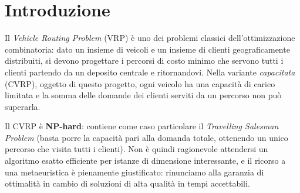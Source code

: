 \documentclass[10pt,a4paper]{article}
\begin{document}
\begin{abstract}
\large
\noindent
Questo lavoro presenta un algoritmo immunologico ispirato al principio della
selezione clonale (opzione~2 della consegna), ibridato con una ricerca locale a
vicinati multipli, per il \emph{Capacitated Vehicle Routing Problem}. L'elemento
portante è la rappresentazione di ogni soluzione come singola permutazione di
clienti (\emph{giant tour}), con la suddivisione in percorsi delegata a un
decodificatore \emph{esatto} basato su programmazione dinamica (\emph{Split}).
Sulle dieci istanze CVRPLIB richieste, con $5$~esecuzioni indipendenti ciascuna e
criterio di arresto $\mathrm{FE}=3.5\times 10^5$, l'algoritmo raggiunge uno scarto
medio dall'ottimo noto dell'$1{,}82\%$ (minimo $0{,}17\%$, massimo $5{,}58\%$);
tutte le città sono servite in tutte le esecuzioni e il vincolo sul numero di
veicoli è sempre rispettato. Un'analisi conclusiva scompone in modo esatto lo
scarto residuo, mostrando che esso è interamente imputabile all'\emph{assegnamento}
dei clienti ai veicoli e non all'\emph{ordinamento} interno dei percorsi, che
risulta ottimo in tutte le soluzioni prodotte.
\end{abstract}
\newpage
{}
\tableofcontents
\bigskip
\newpage
\section{Introduzione}
\label{sec:intro}

Il \emph{Vehicle Routing Problem} (VRP) è uno dei problemi
classici dell'ottimizzazione combinatoria: dato un insieme di veicoli e un
insieme di clienti geograficamente distribuiti, si devono progettare i percorsi
di costo minimo che servono tutti i clienti partendo da un deposito centrale e
ritornandovi. Nella variante \emph{capacitata} (CVRP), oggetto
di questo progetto, ogni veicolo ha una capacità di carico limitata e la somma
delle domande dei clienti serviti da un percorso non può superarla.

Il CVRP è \textbf{NP-hard}: contiene come caso particolare il \emph{Travelling
Salesman Problem} (basta porre la capacità pari alla domanda totale, ottenendo
un unico percorso che visita tutti i clienti). Non è quindi ragionevole
attendersi un algoritmo esatto efficiente per istanze di dimensione
interessante, e il ricorso a una metaeuristica è pienamente giustificato:
rinunciamo alla garanzia di ottimalità in cambio di soluzioni di alta qualità in
tempi accettabili.
\end{document}
